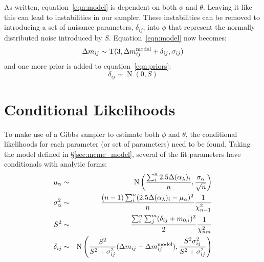 As written, equation~\ref{eqn:model} is dependent on both $\phi$ and $\theta$.  Leaving it like this can lead to instabilities in our sampler.  These instabilities can be removed to introducing a set of nuisance parameters, $\delta_{ij}$, into $\phi$ that represent the normally distributed noise introduced by $S$. Equation~\ref{eqn:model} now becomes:
\begin{equation} \label{eqn:model2}
 \mrel_{ij} \sim \operatorname{T}(3,\mrel_{ij}^{\rm model}+\delta_{ij},\sigma_{ij})
\end{equation}
and one more prior is added to equation~\ref{eqn:priors}:
\begin{equation}
 \delta_{ij} \sim \operatorname{N}(0,S)
\end{equation}

\section{Conditional Likelihoods} \label{sec:conditionals}
To make use of a Gibbs sampler to estimate both $\phi$ and $\theta$, the conditional likelihoods for each parameter (or set of parameters) need to be found. Taking the model defined in \S\ref{sec:mcmc_model}, several of the fit parameters have conditionals with analytic forms:
\begin{eqnarray}
 \mu_{\alpha} &\sim& \operatorname{N}\left( \frac{\sum_i^n 2.5\Delta(\alpha_{\lambda})_i}{n},\frac{\sigma_{\alpha}}{\sqrt{n}} \right) \\
 \sigma_{\alpha}^2 &\sim& \frac{(n-1) \sum_i^n (2.5\Delta(\alpha_{\lambda})_i-\mu_{\alpha})^2}{n} \frac{1}{\chi_{n-1}^2} \\
 S^2 &\sim& \frac{\sum_i^n \sum_j^m (\delta_{ij}+m_{0,i})^2}{2} \frac{1}{\chi_{nm}^2} \\
 \delta_{ij} &\sim& \operatorname{N}\left( \frac{S^2}{S^2+\sigma_{ij}^2} (\Delta m_{ij}-\Delta m_{ij}^{\rm model}), \frac{S^2 \sigma_{ij}^2}{S^2+\sigma_{ij}^2} \right)
\end{eqnarray}

